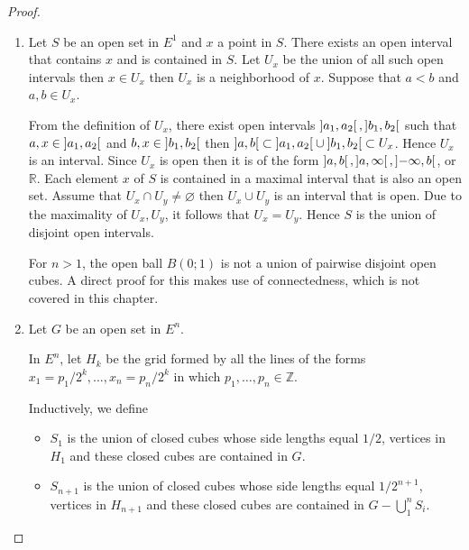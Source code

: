 \begin{proof}
    \begin{enumerate}[label={(\alph*)}]
        \item Let \( S \) be an open set in \( E^{1} \) and \( x \) a point in \( S \). There exists an open interval that contains \( x \) and is contained in \( S \). Let \( U_{x} \) be the union of all such open intervals then \( x \in U_{x} \) then \( U_{x} \) is a neighborhood of \( x \). Suppose that \( a < b \) and \( a, b \in U_{x} \).

              From the definition of \( U_{x} \), there exist open intervals \( \left\rbrack{a_{1}, a_{2}}\right\lbrack, \left\rbrack{b_{1}, b_{2}}\right\lbrack \) such that \( a, x \in \left\rbrack{a_{1}, a_{2}}\right\lbrack \) and \( b, x \in \left\rbrack{b_{1}, b_{2}}\right\lbrack \) then \( \left\rbrack{a, b}\right\lbrack \subset \left\rbrack{a_{1}, a_{2}}\right\lbrack \cup \left\rbrack{b_{1}, b_{2}}\right\lbrack \subset U_{x} \). Hence \( U_{x} \) is an interval. Since \( U_{x} \) is open then it is of the form \( \left\rbrack{a, b}\right\lbrack, \left\rbrack{a, \infty}\right\lbrack, \left\rbrack{-\infty, b}\right\lbrack \), or \( \mathbb{R} \). Each element \( x \) of \( S \) is contained in a maximal interval that is also an open set. Assume that \( U_{x} \cap U_{y} \ne \varnothing \) then \( U_{x} \cup U_{y} \) is an interval that is open. Due to the maximality of \( U_{x}, U_{y} \), it follows that \( U_{x} = U_{y} \). Hence \( S \) is the union of disjoint open intervals.

              For \( n > 1 \), the open ball \( B(0; 1) \) is not a union of pairwise disjoint open cubes. A direct proof for this makes use of connectedness, which is not covered in this chapter.
        \item Let \(G\) be an open set in \( E^{n} \).

              In \( E^{n} \), let \( H_{k} \) be the grid formed by all the lines of the forms \( x_{1} = p_{1}/2^{k}, \ldots, x_{n} = p_{n}/2^{k} \) in which \( p_{1}, \ldots, p_{n} \in \mathbb{Z} \).

              Inductively, we define
              \begin{itemize}
                  \item \( S_{1} \) is the union of closed cubes whose side lengths equal \( 1/2 \), vertices in \( H_{1} \) and these closed cubes are contained in \( G \).
                  \item \( S_{n+1} \) is the union of closed cubes whose side lengths equal \( 1/2^{n+1} \), vertices in \( H_{n+1} \) and these closed cubes are contained in \( G - \bigcup^{n}_{1}S_{i} \).
              \end{itemize}


\end{enumerate}
\end{proof}
